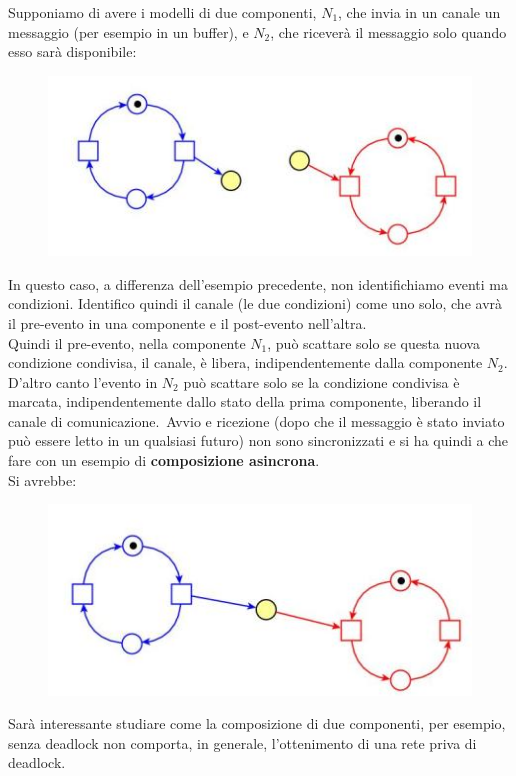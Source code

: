 \documentclass[a4paper,12pt, oneside]{book}
\begin{document}
\begin{esempio}
  Supponiamo di avere i modelli di due componenti, $N_1$, che invia in un canale
  un messaggio (per esempio in un buffer), e $N_2$, che riceverà il messaggio
  solo quando esso sarà disponibile:
  \begin{figure}[H]
    \centering
    \includegraphics[scale = 0.5]{img/asinc.jpg} 
  \end{figure}
  In questo caso, a differenza dell'esempio precedente, non identifichiamo
  eventi ma condizioni. Identifico quindi il canale (le due condizioni) come uno
  solo, che avrà il pre-evento in una componente e il post-evento nell'altra.\\
  Quindi il pre-evento, nella componente $N_1$, può scattare solo se questa
  nuova condizione condivisa, il canale, è libera, indipendentemente dalla
  componente $N_2$. D'altro canto l'evento in $N_2$ può scattare solo se la
  condizione condivisa è marcata, indipendentemente dallo stato della prima
  componente, liberando il canale di comunicazione.\
  Avvio e ricezione (dopo che il messaggio è stato inviato può essere letto in
  un qualsiasi futuro) non sono sincronizzati e si ha quindi a che fare con
  un esempio di \textbf{composizione asincrona}.\\
  Si avrebbe:
  \begin{figure}[H]
    \centering
    \includegraphics[scale = 0.5]{img/asinc2.jpg} 
  \end{figure}
\end{esempio}
Sarà interessante studiare come la composizione di due componenti, per esempio,
senza deadlock non comporta, in generale, l'ottenimento di una rete priva di
deadlock.
\end{document}

